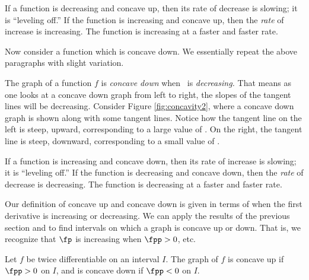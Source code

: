 If a function is decreasing and concave up, then its rate of decrease is slowing; it is ``leveling off.''  If the  function is increasing and concave up, then the \textit{rate} of increase is increasing.  The function is increasing at a faster and faster rate.

Now consider a function which is concave down. We essentially repeat the above paragraphs with slight variation.

The graph of a function $f$ is \textit{concave down}  when \fp\ is \textit{decreasing.} That means as one looks at a concave down graph from left to right, the slopes of the tangent lines will be decreasing. Consider Figure \ref{fig:concavity2}, where a concave down graph is shown along with some tangent lines. Notice how the tangent line on the left is  steep, upward, corresponding to a large value of \fp. On the right, the tangent line is steep, downward, corresponding to a small value of \fp.%


If a function is increasing and concave down, then its rate of increase is slowing; it is ``leveling off.''  If the function is decreasing and concave down, then the \textit{rate} of decrease is decreasing.  The function is decreasing at a faster and faster rate.


Our definition of concave up and concave down is given in terms of when the first derivative is increasing or decreasing. We can apply the results of the previous section and to find intervals on which a graph is concave up or down. That is, we recognize that $\fp$ is increasing when $\fpp>0$, etc. 

%
{Let $f$ be twice differentiable on an interval $I$. The graph of $f$ is concave up if $\fpp>0$ on $I$, and is concave down if $\fpp<0$ on $I$. 
}


